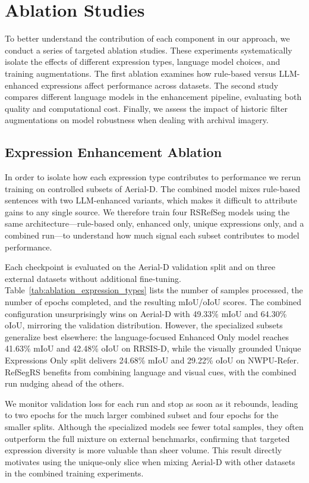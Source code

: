 \section{Ablation Studies}

To better understand the contribution of each component in our approach, we conduct a series of targeted ablation studies. These experiments systematically isolate the effects of different expression types, language model choices, and training augmentations. The first ablation examines how rule-based versus LLM-enhanced expressions affect performance across datasets. The second study compares different language models in the enhancement pipeline, evaluating both quality and computational cost. Finally, we assess the impact of historic filter augmentations on model robustness when dealing with archival imagery.

\subsection{Expression Enhancement Ablation}

In order to isolate how each expression type contributes to performance we rerun training on controlled subsets of Aerial-D. The combined model mixes rule-based sentences with two LLM-enhanced variants, which makes it difficult to attribute gains to any single source. We therefore train four RSRefSeg models using the same architecture—rule-based only, enhanced only, unique expressions only, and a combined run—to understand how much signal each subset contributes to model performance.

Each checkpoint is evaluated on the Aerial-D validation split and on three external datasets without additional fine-tuning. Table~\ref{tab:ablation_expression_types} lists the number of samples processed, the number of epochs completed, and the resulting mIoU/oIoU scores. The combined configuration unsurprisingly wins on Aerial-D with 49.33\% mIoU and 64.30\% oIoU, mirroring the validation distribution. However, the specialized subsets generalize best elsewhere: the language-focused Enhanced Only model reaches 41.63\% mIoU and 42.48\% oIoU on RRSIS-D, while the visually grounded Unique Expressions Only split delivers 24.68\% mIoU and 29.22\% oIoU on NWPU-Refer. RefSegRS benefits from combining language and visual cues, with the combined run nudging ahead of the others.

We monitor validation loss for each run and stop as soon as it rebounds, leading to two epochs for the much larger combined subset and four epochs for the smaller splits. Although the specialized models see fewer total samples, they often outperform the full mixture on external benchmarks, confirming that targeted expression diversity is more valuable than sheer volume. This result directly motivates using the unique-only slice when mixing Aerial-D with other datasets in the combined training experiments.


